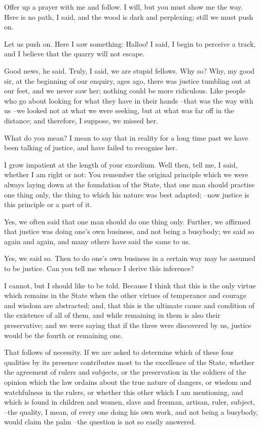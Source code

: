 Offer up a prayer with me and follow.
I will, but you must show me the way.
Here is no path, I said, and the wood is dark and perplexing; still we must push on.

Let us push on.
Here I saw something: Halloo! I said, I begin to perceive a track, and I believe that the quarry will not escape.

Good news, he said.
Truly, I said, we are stupid fellows.
Why so?
Why, my good sir, at the beginning of our enquiry, ages ago, there was justice tumbling out at our feet, and we never saw her; nothing could be more ridiculous. Like people who go about looking for what they have in their hands --that was the way with us --we looked not at what we were seeking, but at what was far off in the distance; and therefore, I suppose, we missed her.

What do you mean?
I mean to say that in reality for a long time past we have been talking of justice, and have failed to recognise her.

I grow impatient at the length of your exordium.
Well then, tell me, I said, whether I am right or not: You remember the original principle which we were always laying down at the foundation of the State, that one man should practise one thing only, the thing to which his nature was best adapted; --now justice is this principle or a part of it.

Yes, we often said that one man should do one thing only.
Further, we affirmed that justice was doing one's own business, and not being a busybody; we said so again and again, and many others have said the same to us.

Yes, we said so.
Then to do one's own business in a certain way may be assumed to be justice. Can you tell me whence I derive this inference?

I cannot, but I should like to be told.
Because I think that this is the only virtue which remains in the State when the other virtues of temperance and courage and wisdom are abstracted; and, that this is the ultimate cause and condition of the existence of all of them, and while remaining in them is also their preservative; and we were saying that if the three were discovered by us, justice would be the fourth or remaining one.

That follows of necessity.
If we are asked to determine which of these four qualities by its presence contributes most to the excellence of the State, whether the agreement of rulers and subjects, or the preservation in the soldiers of the opinion which the law ordains about the true nature of dangers, or wisdom and watchfulness in the rulers, or whether this other which I am mentioning, and which is found in children and women, slave and freeman, artisan, ruler, subject, --the quality, I mean, of every one doing his own work, and not being a busybody, would claim the palm --the question is not so easily answered.

